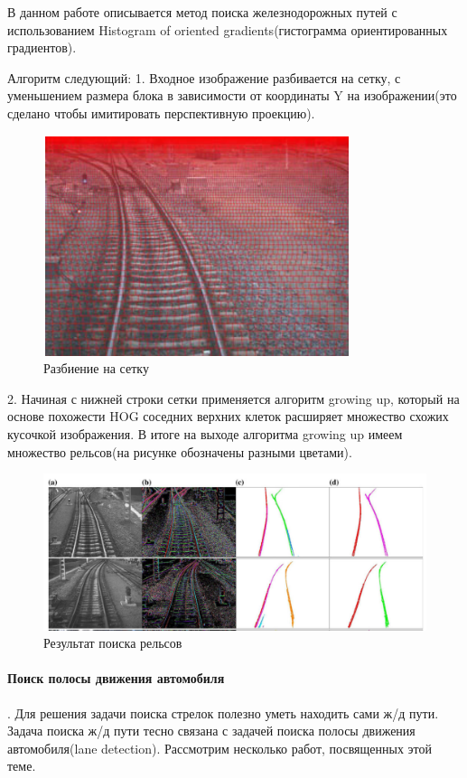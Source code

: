 В данном работе описывается метод поиска железнодорожных путей с использованием Histogram of oriented gradients\cite{b:HOG}(гистограмма ориентированных градиентов).

Алгоритм следующий:
1. Входное изображение разбивается на сетку, с уменьшением размера блока в зависимости от координаты Y на изображении(это сделано чтобы имитировать перспективную проекцию).
\begin{figure}[!h]
	\centering
	\includegraphics[width=0.5\linewidth]{pictures/screenshot009}
	\caption{Разбиение на сетку}
	\label{fig:screenshot009}
\end{figure}

2. Начиная с нижней строки сетки применяется алгоритм growing up, который на основе похожести HOG соседних верхних клеток расширяет множество схожих кусочкой изображения.
В итоге на выходе алгоритма growing up имеем множество рельсов(на рисунке обозначены разными цветами).
\begin{figure}[!h]
	\centering
	\includegraphics[width=1\linewidth]{pictures/screenshot010}
	\caption{Результат поиска рельсов}
	\label{fig:screenshot010}
\end{figure}
\newpage
\paragraph{Поиск полосы движения автомобиля \cite{b:lane_detection}}.
Для решения задачи поиска стрелок полезно уметь находить сами ж/д пути.
Задача поиска ж/д пути тесно связана с задачей поиска полосы движения автомобиля(lane detection). Рассмотрим несколько работ, посвященных этой теме.

